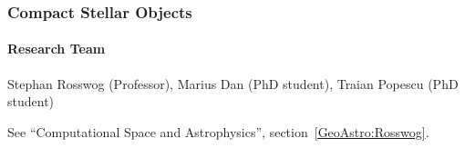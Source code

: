\subsubsection{Compact Stellar Objects}

\paragraph{Research Team}
Stephan Rosswog (Professor), Marius Dan (PhD student), Traian
Popescu (PhD student)



\vspace{1em}

See ``Computational Space and Astrophysics'',
section~\ref{GeoAstro:Rosswog}.
